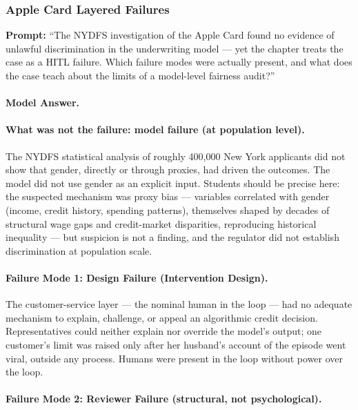 \subsubsection{Apple Card Layered Failures}

\textbf{Prompt:} ``The NYDFS investigation of the Apple Card found no evidence of unlawful discrimination in the underwriting model --- yet the chapter treats the case as a HITL failure. Which failure modes were actually present, and what does the case teach about the limits of a model-level fairness audit?''

\paragraph{Model Answer.}

\paragraph{What was not the failure: model failure (at population level).}

The NYDFS statistical analysis of roughly 400,000 New York applicants did not show that gender, directly or through proxies, had driven the outcomes. The model did not use gender as an explicit input. Students should be precise here: the suspected mechanism was proxy bias --- variables correlated with gender (income, credit history, spending patterns), themselves shaped by decades of structural wage gaps and credit-market disparities, reproducing historical inequality --- but suspicion is not a finding, and the regulator did not establish discrimination at population scale.

\paragraph{Failure Mode 1: Design Failure (Intervention Design).}

The customer-service layer --- the nominal human in the loop --- had no adequate mechanism to explain, challenge, or appeal an algorithmic credit decision. Representatives could neither explain nor override the model's output; one customer's limit was raised only after her husband's account of the episode went viral, outside any process. Humans were present in the loop without power over the loop.

\paragraph{Failure Mode 2: Reviewer Failure (structural, not psychological).}

